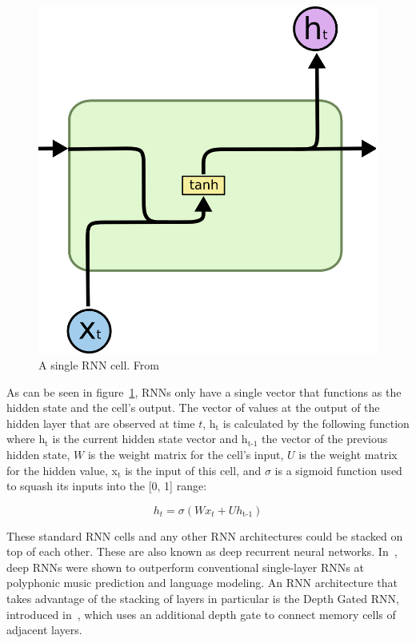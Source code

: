 \begin{figure}
	\begin{center}
		\includegraphics[scale=0.5]{rnn/rnn_cell}
	\end{center}
	\caption{A single RNN cell. From~\cite{olah2015understanding}\label{fig:rnn_cell}}
\end{figure}

As can be seen in figure~\ref{fig:rnn_cell}, RNNs only have a single vector that functions as the hidden state and the cell's output. The vector of values at the output of the hidden layer that are observed at time \(t\), h\(_{\text{t}}\) is calculated by the following function where h\(_{\text{t}}\) is the current hidden state vector and h\(_{\text{t-1}}\) the vector of the previous hidden state, \(W\) is the weight matrix for the cell's input, \(U\) is the weight matrix for the hidden value, x\(_{\text{t}}\) is the input of this cell, and \(\sigma \) is a sigmoid function used to squash its inputs into the [0, 1] range:

\begin{equation} \label{eq:something}
h_t = \sigma(Wx_t + Uh_\text{t-1})
\end{equation}

These standard RNN cells and any other RNN architectures could be stacked on top of each other. These are also known as deep recurrent neural networks. In~\cite{pascanu2013construct}, deep RNNs were shown to outperform conventional single-layer RNNs at polyphonic music prediction and language modeling. An RNN architecture that takes advantage of the stacking of layers in particular is the Depth Gated RNN, introduced in~\cite{yao2015depth}, which uses an additional depth gate to connect memory cells of adjacent layers.

